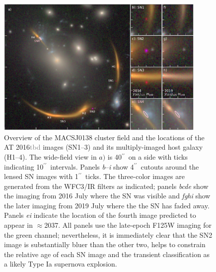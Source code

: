 \documentclass[12pt,dvipsnames]{article}
\gdef\arcsec{$^{\prime\prime}$}
\def\SNABC{AT 2016{\textcolor{Gray}{tbd}}\xspace}
\begin{document}

\clearpage
\begin{figure}
    \centering
    \includegraphics[draft=False,width=0.9\textwidth]{Paper/Figures/fig1_layout_sn4.pdf}
    \caption{Overview of the MACSJ0138 cluster field and the locations of the \SNABC images  (SN1--3) and its multiply-imaged host galaxy (H1--4). The wide-field view in $a)$ is 40\arcsec\ on a side with ticks indicating 10\arcsec\ intervals.  Panels \emph{b}--\emph{i} show 4\arcsec\ cutouts around the lensed SN images with 1\arcsec\ ticks.  The three-color images are generated from the WFC3/IR filters as indicated; panels \emph{bcde} show the imaging from 2016 July where the SN was visible and \emph{fghi} show the later imaging from 2019 July where the the SN has faded away.  Panels \emph{ei} indicate the location of the fourth image predicted to appear in $\approx$2037. All panels use the late-epoch F125W imaging for the green channel; nevertheless, it is immediately clear that the SN2 image is substantially bluer than the other two, helps to constrain the relative age of each SN image and the transient classification as a likely Type Ia supernova explosion.}
    
    \label{fig:layout}
\end{figure}
\clearpage
\end{document}
